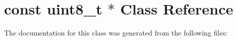 \hypertarget{classconst_01uint8__t_01_5}{}\section{const uint8\+\_\+t $\ast$ Class Reference}
\label{classconst_01uint8__t_01_5}


The documentation for this class was generated from the following files\+: